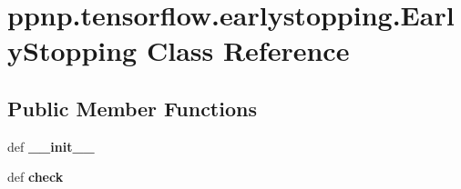 \hypertarget{classppnp_1_1tensorflow_1_1earlystopping_1_1EarlyStopping}{}\section{ppnp.\+tensorflow.\+earlystopping.\+Early\+Stopping Class Reference}
\label{classppnp_1_1tensorflow_1_1earlystopping_1_1EarlyStopping}
\subsection*{Public Member Functions}
\begin{DoxyCompactItemize}
\item 
\mbox{\label{classppnp_1_1tensorflow_1_1earlystopping_1_1EarlyStopping_af39e6b0e7ee8e6afdf56ee657c6f6a60}} 
def {\bfseries \+\_\+\+\_\+init\+\_\+\+\_\+}
\item 
\mbox{\label{classppnp_1_1tensorflow_1_1earlystopping_1_1EarlyStopping_a7ed8932f341729497c65dacafda6598a}} 
def {\bfseries check}
\end{DoxyCompactItemize}
